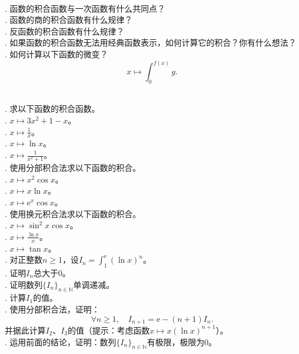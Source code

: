\documentclass[12pt,UTF8]{ctexbook}
\begin{document}
\begin{sk}
    \mbox{} \\
    . 函数的积合函数与一次函数有什么共同点？ \\
    . 函数的商的积合函数有什么规律？\\
    . 反函数的积合函数有什么规律？\\
    . 如果函数的积合函数无法用经典函数表示，如何计算它的积合？你有什么想法？\\
    . 如何计算以下函数的微变？
    $$x\mapsto \int_0^{f(x)} g.$$
\end{sk}

\begin{xt}
    \mbox{} \\
    . 求以下函数的积合函数。\\
    . $x\mapsto 3x^2 + 1 - x$。\\
    . $x\mapsto \frac{1}{x}$。\\
    . $x\mapsto \ln{x}$。\\
    . $x\mapsto \frac{1}{x^2 + 1}$。\\
    . 使用分部积合法求以下函数的积合。\\
    . $x\mapsto x^2 \cos{x}$。 \\
    . $x\mapsto x \ln{x} $。 \\
    . $x\mapsto \mathrm{e}^x \cos{x} $。 \\
    . 使用换元积合法求以下函数的积合。\\
    . $x\mapsto \sin^2{x} \cos{x}$。 \\
    . $x\mapsto \frac{\ln{x}}{x} $。 \\
    . $x\mapsto \tan{x} $。 \\
    . 对正整数$n\geqslant 1$，设$\displaystyle I_n = \int_1^{\mathrm{e}} \left(\ln{x}\right)^n$。\\
    . 证明$I_n$总大于$0$。\\
    . 证明数列$\{I_n\}_{n\in\mathbb{N}}$单调递减。\\
    . 计算$I_1$的值。\\
    . 使用分部积合法，证明：
    $$ \forall n \geqslant 1,\quad I_{n+1} = \mathrm{e} - (n+1)I_n.$$
    \indent 并据此计算$I_2$、$I_3$的值（提示：考虑函数$x\mapsto x\left(\ln{x}\right)^{n+1}$）。\\
    . 运用前面的结论，证明：数列$\{I_n\}_{n\in\mathbb{N}}$有极限，极限为$0$。\\

\end{xt}
\end{document}
